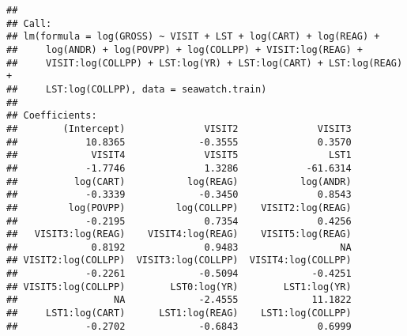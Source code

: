 \documentclass[]{article}
\begin{document}
\begin{verbatim}
## 
## Call:
## lm(formula = log(GROSS) ~ VISIT + LST + log(CART) + log(REAG) + 
##     log(ANDR) + log(POVPP) + log(COLLPP) + VISIT:log(REAG) + 
##     VISIT:log(COLLPP) + LST:log(YR) + LST:log(CART) + LST:log(REAG) + 
##     LST:log(COLLPP), data = seawatch.train)
## 
## Coefficients:
##        (Intercept)              VISIT2              VISIT3  
##            10.8365             -0.3555              0.3570  
##             VISIT4              VISIT5                LST1  
##            -1.7746              1.3286            -61.6314  
##          log(CART)           log(REAG)           log(ANDR)  
##            -0.3339             -0.3450              0.8543  
##         log(POVPP)         log(COLLPP)    VISIT2:log(REAG)  
##            -0.2195              0.7354              0.4256  
##   VISIT3:log(REAG)    VISIT4:log(REAG)    VISIT5:log(REAG)  
##             0.8192              0.9483                  NA  
## VISIT2:log(COLLPP)  VISIT3:log(COLLPP)  VISIT4:log(COLLPP)  
##            -0.2261             -0.5094             -0.4251  
## VISIT5:log(COLLPP)        LST0:log(YR)        LST1:log(YR)  
##                 NA             -2.4555             11.1822  
##     LST1:log(CART)      LST1:log(REAG)    LST1:log(COLLPP)  
##            -0.2702             -0.6843              0.6999
\end{verbatim}
\end{document}
